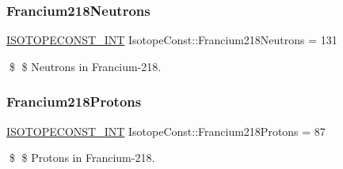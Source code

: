 \subsubsection{\texorpdfstring{Francium218\+Neutrons}{Francium218Neutrons}}
{\footnotesize\ttfamily \mbox{\hyperlink{group___isotope_const-_macros_ga5f18360b3e99483a35c32d789e62621c}{I\+S\+O\+T\+O\+P\+E\+C\+O\+N\+S\+T\+\_\+\+I\+NT}} Isotope\+Const\+::\+Francium218\+Neutrons = 131}

\$ \$ Neutrons in Francium-\/218. \mbox{\label{group___isotope_const-_francium-_fr218_ga59f00fa51bbfa5ac3bf0f529fe4a8252}} 
\subsubsection{\texorpdfstring{Francium218\+Protons}{Francium218Protons}}
{\footnotesize\ttfamily \mbox{\hyperlink{group___isotope_const-_macros_ga5f18360b3e99483a35c32d789e62621c}{I\+S\+O\+T\+O\+P\+E\+C\+O\+N\+S\+T\+\_\+\+I\+NT}} Isotope\+Const\+::\+Francium218\+Protons = 87}

\$ \$ Protons in Francium-\/218. 
